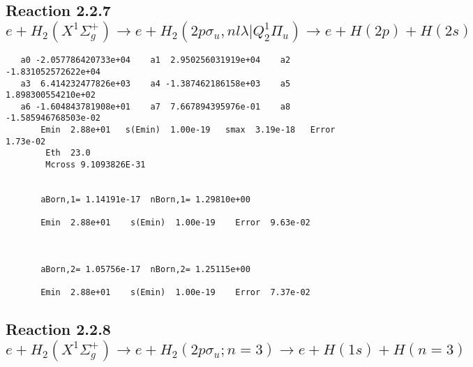 \documentclass[12pt,dvipdfmx]{article}
\begin{document}
\newpage
\subsection{
Reaction 2.2.7 $ e + H_2(X^1\Sigma_g^+) \rightarrow e + H_2(2p\sigma_u, nl\lambda|Q_2^1\Pi_u) \rightarrow e + H(2p) + H(2s)$}
















\begin{small}\begin{verbatim}
   a0 -2.057786420733e+04    a1  2.950256031919e+04    a2 -1.831052572622e+04
   a3  6.414232477826e+03    a4 -1.387462186158e+03    a5  1.898300554210e+02
   a6 -1.604843781908e+01    a7  7.667894395976e-01    a8 -1.585946768503e-02
       Emin  2.88e+01   s(Emin)  1.00e-19   smax  3.19e-18   Error  1.73e-02
        Eth  23.0
        Mcross 9.1093826E-31


       aBorn,1= 1.14191e-17  nBorn,1= 1.29810e+00

       Emin  2.88e+01    s(Emin)  1.00e-19    Error  9.63e-02



       aBorn,2= 1.05756e-17  nBorn,2= 1.25115e+00

       Emin  2.88e+01    s(Emin)  1.00e-19    Error  7.37e-02
\end{verbatim}\end{small}




\newpage
\subsection{
Reaction 2.2.8 $e + H_2(X^1\Sigma_g^+) \rightarrow e + H_2(2p\sigma_u;n=3) \rightarrow e + H(1s) + H(n=3)$}






\end{document}

